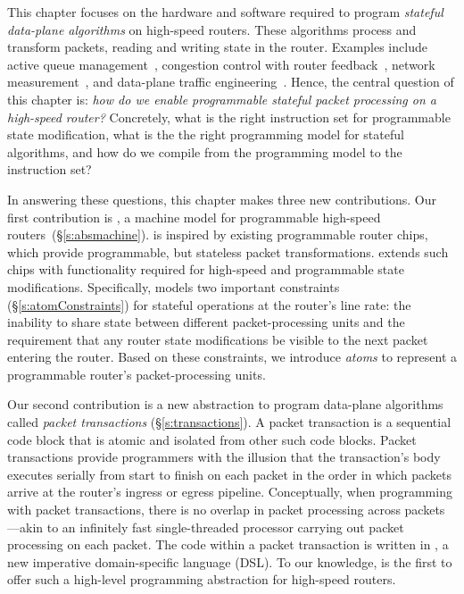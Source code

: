 This chapter focuses on the hardware and software required to program {\em
stateful data-plane algorithms} on high-speed routers. These algorithms process
and transform packets, reading and writing state in the router. Examples
include active queue management~\cite{red,avq,codel}, congestion control with
router feedback~\cite{xcp, rcp}, network measurement~\cite{opensketch,
bitmap_george}, and data-plane traffic engineering~\cite{conga, flowlets}.
Hence, the central question of this chapter is: {\em how do we enable
programmable stateful packet processing on a high-speed router?} Concretely,
what is the right instruction set for programmable state modification, what is
the the right programming model for stateful algorithms, and how do we compile
from the programming model to the instruction set?

In answering these questions, this chapter makes three new contributions.  Our
first contribution is {\em \absmachine}, a machine model for programmable
high-speed routers~(\S\ref{s:absmachine}).  \absmachine is inspired by existing
programmable router chips, which provide programmable, but stateless packet
transformations. \absmachine extends such chips with functionality required for
high-speed and programmable state modifications.  Specifically, \absmachine
models two important constraints (\S\ref{s:atomConstraints}) for stateful
operations at the router's line rate: the inability to share state between
different packet-processing units and the requirement that any router state
modifications be visible to the next packet entering the router. Based on these
constraints, we introduce {\em atoms} to represent a programmable router's
packet-processing units.

Our second contribution is a new abstraction to program data-plane algorithms
called {\em packet transactions} (\S\ref{s:transactions}). A packet transaction
is a sequential code block that is atomic and isolated from other such code
blocks.  Packet transactions provide programmers with the illusion that the
transaction's body executes serially from start to finish on each packet in the
order in which packets arrive at the router's ingress or egress pipeline.
Conceptually, when programming with packet transactions, there is no overlap in
packet processing across packets---akin to an infinitely fast single-threaded
processor carrying out packet processing on each packet. The code within a
packet transaction is written in {\em \pktlanguage{}}, a new imperative
domain-specific language (DSL). To our knowledge, \pktlanguage is the first to
offer such a high-level programming abstraction for high-speed routers.

